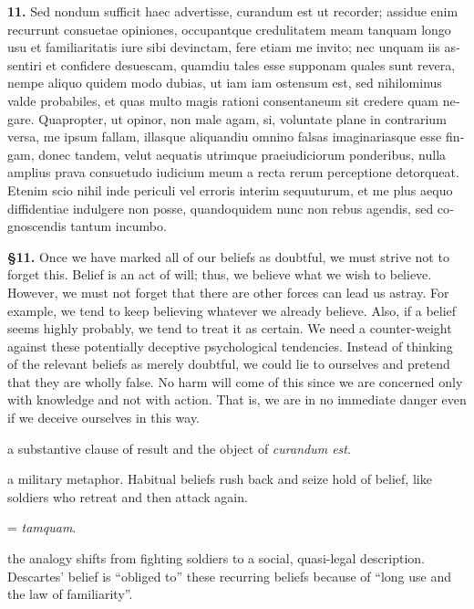 \clearpage

\beginnumbering
\pstart
\begin{latin}
    \textenglish{\textbf{11.}} Sed nondum sufficit haec advertisse, curandum est ut recorder; assidue enim recurrunt consuetae opiniones, occupantque credulitatem meam tanquam longo usu et familiaritatis iure sibi devinctam, fere etiam me invito; nec unquam iis assentiri et confidere desuescam, quamdiu tales esse supponam quales sunt revera, nempe aliquo quidem modo dubias, ut iam iam ostensum est, sed nihilominus valde probabiles, et quas multo magis rationi consentaneum sit credere quam negare. Quapropter, ut opinor, non male agam, si, voluntate plane in contrarium versa, me ipsum fallam, illasque aliquandiu omnino falsas imaginariasque esse fingam, donec tandem, velut aequatis utrimque praeiudiciorum ponderibus, nulla amplius prava consuetudo iudicium meum a recta rerum perceptione detorqueat. Etenim scio nihil inde periculi vel erroris interim sequuturum, et me plus aequo diffidentiae indulgere non posse, quandoquidem nunc non rebus agendis, sed cognoscendis tantum incumbo.
\end{latin}
\pend
\endnumbering

\prenotes

\textbf{§11.} Once we have marked all of our beliefs as doubtful, we must strive not to forget this. Belief is an act of will; thus, we believe what we wish to believe. However, we must not forget that there are other forces can lead us astray. For example, we tend to keep believing whatever we already believe. Also, if a belief seems highly probably, we tend to treat it as certain. We need a counter-weight against these potentially deceptive psychological tendencies. Instead of thinking of the relevant beliefs as merely doubtful, we could lie to ourselves and pretend that they are wholly false. No harm will come of this since we are concerned only with knowledge and not with action. That is, we are in no immediate danger even if we deceive ourselves in this way.

 a substantive clause of result and the object of \textit{curandum est}.

 a military metaphor. Habitual beliefs rush back and seize hold of belief, like soldiers who retreat and then attack again.

 = \textit{tamquam}. 

 the analogy shifts from fighting soldiers to a social, quasi-legal description. Descartes' belief is ``obliged to'' these recurring beliefs because of ``long use and the law of familiarity''.

